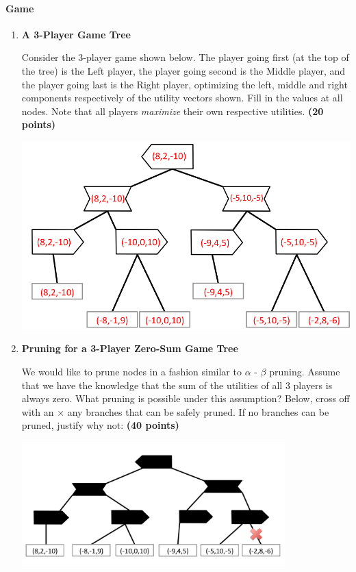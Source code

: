 \paragraph{Game}

\begin{enumerate}

\item {\bf A 3-Player Game Tree} 

Consider the 3-player game shown below.  The player going first (at the top
of the tree) is the Left player, the player going second is the Middle
player, and the player going last is the Right player, optimizing the
left, middle and right components respectively of the utility vectors shown. Fill in the
values at all nodes.  Note that all players \emph{maximize} their
own respective utilities. {\bf (20 points)}

\begin{center}
    \includegraphics[width=5in]{figures/abg_solution}
\end{center}

\vspace{1cm}


\item {\bf Pruning for a 3-Player Zero-Sum Game Tree}

We would like to prune nodes in a fashion similar to $\alpha$ - $\beta$ pruning.  Assume that we have the knowledge that the sum of the utilities of all 3 players is always zero.
What pruning is possible under this assumption?  Below, cross off with an $\times$ any branches that can be safely pruned.   If no branches can be pruned, justify why not: {\bf (40 points)}

\begin{center}
     \includegraphics[width=4in]{figures/solution_b}
\end{center}


\end{enumerate}
